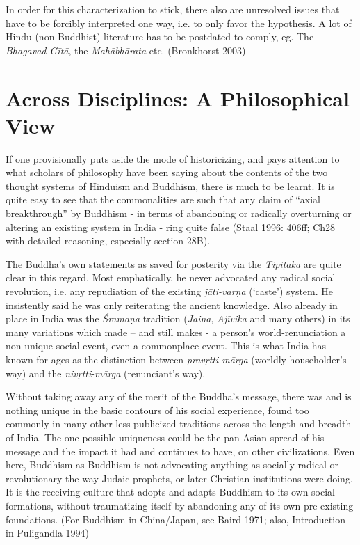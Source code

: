 In order for this characterization to stick, there also are unresolved issues that have to be forcibly interpreted one way, i.e. to only favor the hypothesis. A lot of Hindu (non-Buddhist) literature has to be postdated to comply, eg. The \textit{Bhagavad Gītā}, the \textit{Mahābhārata} etc. (Bronkhorst 2003)


\section*{Across Disciplines: A Philosophical View}

If one provisionally puts aside the mode of historicizing, and pays attention to what scholars of philosophy have been saying about the contents of the two thought systems of Hinduism and Buddhism, there is much to be learnt. It is quite easy to see that the commonalities are such that any claim of “axial breakthrough” by Buddhism - in terms of abandoning or radically overturning or altering an existing system in India - ring quite false (Staal 1996: 406ff; Ch28 with detailed reasoning, especially section 28B).

The Buddha’s own statements as saved for posterity via the \textit{Tipiṭaka} are quite clear in this regard. Most emphatically, he never advocated any radical social revolution, i.e. any repudiation of the existing \textit{jāti-varṇa} (‘caste’) system. He insistently said he was only reiterating the ancient knowledge. Also already in place in India was the \textit{Śramaṇa} tradition (\textit{Jaina}, \textit{Ājīvika} and many others) in its many variations which made – and still makes - a person’s world-renunciation a non-unique social event, even a commonplace event. This is what India has known for ages as the distinction between \textit{pravṛtti-mārga} (worldly householder’s way) and the \textit{nivṛtti}-\textit{mārga} (renunciant’s way).

Without taking away any of the merit of the Buddha’s message, there was and is nothing unique in the basic contours of his social experience, found too commonly in many other less publicized traditions across the length and breadth of India. The one possible uniqueness could be the pan Asian spread of his message and the impact it had and continues to have, on other civilizations. Even here, Buddhism-as-Buddhism is not advocating anything as socially radical or revolutionary the way Judaic prophets, or later Christian institutions were doing. It is the receiving culture that adopts and adapts Buddhism to its own social formations, without traumatizing itself by abandoning any of its own pre-existing foundations. (For Buddhism in China/Japan, see Baird 1971; also, Introduction in Puligandla 1994)


